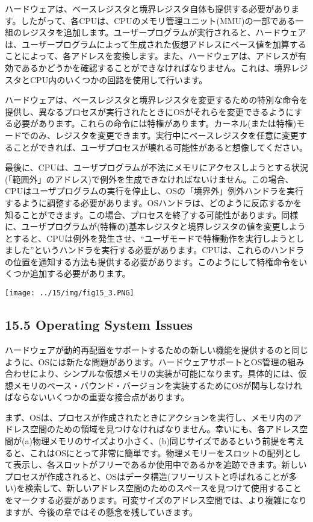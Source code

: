 ハードウェアは、ベースレジスタと境界レジスタ自体も提供する必要があります。したがって、各CPUは、CPUのメモリ管理ユニット(MMU)の一部である一組のレジスタを追加します。ユーザープログラムが実行されると、ハードウェアは、ユーザープログラムによって生成された仮想アドレスにベース値を加算することによって、各アドレスを変換します。また、ハードウェアは、アドレスが有効であるかどうかを確認することができなければなりません。これは、境界レジスタとCPU内のいくつかの回路を使用して行います。

ハードウェアは、ベースレジスタと境界レジスタを変更するための特別な命令を提供し、異なるプロセスが実行されたときにOSがそれらを変更できるようにする必要があります。これらの命令には特権があります。カーネル(または特権)モードでのみ、レジスタを変更できます。実行中にベースレジスタを任意に変更することができれば、ユーザプロセスが壊れる可能性があると想像してください。

最後に、CPUは、ユーザプログラムが不法にメモリにアクセスしようとする状況(「範囲外」のアドレス)で例外を生成できなければないけません。この場合、CPUはユーザプログラムの実行を停止し、OSの「境界外」例外ハンドラを実行するように調整する必要があります。OSハンドラは、どのように反応するかを知ることができます。この場合、プロセスを終了する可能性があります。同様に、ユーザプログラムが(特権の)基本レジスタと境界レジスタの値を変更しようとすると、CPUは例外を発生させ、``ユーザモードで特権動作を実行しようとしました''というハンドラを実行する必要があります。CPUは、これらのハンドラの位置を通知する方法も提供する必要があります。このようにして特権命令をいくつか追加する必要があります。

\texttt{[image: ../15/img/fig15\_3.PNG]}

\hypertarget{operating-system-issues}{%
\subsection*{15.5 Operating System
Issues}\label{operating-system-issues}}

ハードウェアが動的再配置をサポートするための新しい機能を提供するのと同じように、OSには新たな問題があります。ハードウェアサポートとOS管理の組み合わせにより、シンプルな仮想メモリの実装が可能になります。具体的には、仮想メモリのベース・バウンド・バージョンを実装するためにOSが関与しなければならないいくつかの重要な接合点があります。

まず、OSは、プロセスが作成されたときにアクションを実行し、メモリ内のアドレス空間のための領域を見つけなければなりません。幸いにも、各アドレス空間が(a)物理メモリのサイズより小さく、(b)同じサイズであるという前提を考えると、これはOSにとって非常に簡単です。物理メモリーをスロットの配列として表示し、各スロットがフリーであるか使用中であるかを追跡できます。新しいプロセスが作成されると、OSはデータ構造(フリーリストと呼ばれることが多い)を検索して、新しいアドレス空間のためのスペースを見つけて使用することをマークする必要があります。可変サイズのアドレス空間では、より複雑になりますが、今後の章ではその懸念を残していきます。

